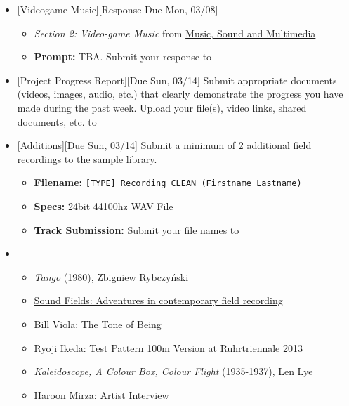 \def\dMon{Mon, 03/08}
\def\dTues{Tues, 03/09}
\def\dWed{Wed, 03/10}
\def\dThur{Thur, 03/11}
\def\dFri{Fri, 03/12}
\def\dSat{Sat, 03/13}
\def\dSun{Sun, 03/14}
\placeDate

\begin{itemize}[noitemsep,topsep=0pt,leftmargin=*]
	\item {}[Videogame Music][Response Due \dMon]
	      \begin{itemize}
		      \item \emph{Section 2: Video-game Music} from \href{supplements/Music_Sound_and_Multimedia_-_From_the_Live_to_the_Virtual_(Music_and_the_Moving_Image)_(2008).pdf}{Music, Sound and Multimedia}
		      \item \textbf{Prompt:} TBA. Submit your response to \discordR
	      \end{itemize}

	\item {}[Project Progress Report][Due \dSun] \newline
	      Submit appropriate documents (videos, images, audio, etc.) that clearly demonstrate the progress you have made during the past week. Upload your file(s), video links, shared documents, etc. to \discordE
	\item {}[Additions][Due \dSun] \newline
	      Submit a minimum of 2 additional field recordings to the \href{\samplelibPermURL}{sample library}.
	      \begin{itemize}
		      \item \textbf{Filename:} \texttt{[TYPE] Recording CLEAN (Firstname Lastname)}
		      \item \textbf{Specs:} 24bit 44100hz WAV File
		      \item \textbf{Track Submission:} Submit your file names to \discordS
	      \end{itemize}
	\item {}
	      \begin{itemize}
		      \item \href{https://www.youtube.com/watch?v=u0pEpA_Y1a4}{\emph{Tango}} (1980), Zbigniew Rybczyński
		      \item \href{https://www.youtube.com/watch?v=esfUwg1-xrI}{Sound Fields: Adventures in contemporary field recording}
		      \item \href{https://vimeo.com/64302190}{Bill Viola: The Tone of Being}
		      \item \href{https://www.youtube.com/watch?v=XwjlYpJCBgk}{Ryoji Ikeda: Test Pattern 100m Version at Ruhrtriennale 2013}
		      \item \href{https://www.youtube.com/watch?v=-DksmbDMDUU}{\emph{Kaleidoscope, A Colour Box, Colour Flight}} (1935-1937), Len Lye
		      \item \href{https://www.youtube.com/watch?v=Y8Zpr1ESEO4}{Haroon Mirza: Artist Interview}
	      \end{itemize}
\end{itemize}